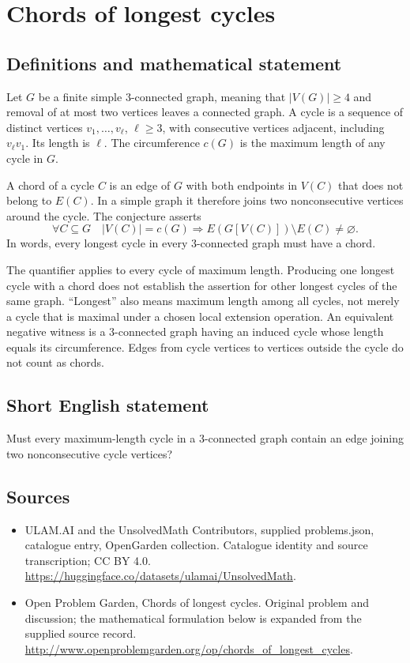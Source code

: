 \documentclass[11pt,a4paper]{article}
\begin{document}
\section*{Chords of longest cycles}\label{statement}

\subsection{Definitions and mathematical statement}
Let $G$ be a finite simple $3$-connected graph, meaning that
$|V(G)|\geq4$ and removal of at most two vertices leaves a
connected graph. A cycle is a sequence of distinct vertices
$v_1,\ldots,v_\ell$, $\ell\geq3$, with consecutive vertices
adjacent, including $v_\ell v_1$. Its length is $\ell$.
The circumference $c(G)$ is the maximum length of any cycle
in $G$.

A chord of a cycle $C$ is an edge of $G$ with both endpoints
in $V(C)$ that does not belong to $E(C)$. In a simple graph
it therefore joins two nonconsecutive vertices around the
cycle. The conjecture asserts
\[
 \forall C\subseteq G\quad
 |V(C)|=c(G)\Longrightarrow
 E(G[V(C)])\setminus E(C)\neq\varnothing.
\]
In words, every longest cycle in every $3$-connected graph
must have a chord.

The quantifier applies to every cycle of maximum length.
Producing one longest cycle with a chord does not establish
the assertion for other longest cycles of the same graph.
``Longest'' also means maximum length among all cycles,
not merely a cycle that is maximal under a chosen local
extension operation. An equivalent negative witness is a
$3$-connected graph having an induced cycle whose length
equals its circumference. Edges from cycle vertices to
vertices outside the cycle do not count as chords.
\subsection{Short English statement}
Must every maximum-length cycle in a 3-connected graph contain an edge joining two nonconsecutive cycle vertices?
\subsection{Sources}
\begin{itemize}
\item[S1] ULAM.AI and the UnsolvedMath Contributors, supplied problems.json, catalogue entry, OpenGarden collection. Catalogue identity and source transcription; CC BY 4.0.
\url{https://huggingface.co/datasets/ulamai/UnsolvedMath}.
\item[S2] Open Problem Garden, Chords of longest cycles. Original problem and discussion; the mathematical formulation below is expanded from the supplied source record.
\url{http://www.openproblemgarden.org/op/chords_of_longest_cycles}.
\end{itemize}
\end{document}

